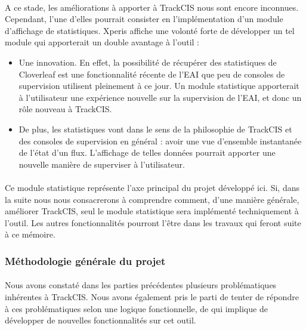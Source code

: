			\paragraph{}%
			A ce stade, les améliorations à apporter à TrackCIS nous sont encore
			inconnues. Cependant, l'une d'elles pourrait consister en l'implémentation
			d'un module d'affichage de statistiques. Xperis affiche une volonté forte de
			développer un tel module qui apporterait un double avantage à l'outil :
			\begin{itemize}
			  \item Une innovation. En effet, la possibilité de récupérer des
			  statistiques de Cloverleaf est une fonctionnalité récente de l'EAI que peu
			  de consoles de supervision utilisent pleinement à ce jour. Un module
			  statistique apporterait à l'utilisateur une expérience nouvelle sur la
			  supervision de l'EAI, et donc un rôle nouveau à TrackCIS.
			  \item De plus, les statistiques vont dans le sens de la philosophie de
			  TrackCIS et des consoles de supervision en général : avoir une vue
			  d'ensemble instantanée de l'état d'un flux. L'affichage de telles données
			  pourrait apporter une nouvelle manière de superviser à l'utilisateur.
			\end{itemize}
			
			\paragraph{}
			Ce module statistique représente l'axe principal du projet développé ici. Si,
			dans la suite nous nous consacrerons à comprendre comment, d'une manière
			générale, améliorer TrackCIS, seul le module statistique sera implémenté
			techniquement à l'outil. Les autres fonctionnalités pourront l'être dans les
			travaux qui feront suite à ce mémoire.
			
		\subsubsection{Méthodologie générale du projet}
			\paragraph{}%
			Nous avons constaté dans les parties précédentes plusieurs problématiques
			inhérentes à TrackCIS. Nous avons également pris le parti de tenter de
			répondre à ces problématiques selon une logique fonctionnelle, de qui
			implique de développer de nouvelles fonctionnalités sur cet outil.
			
